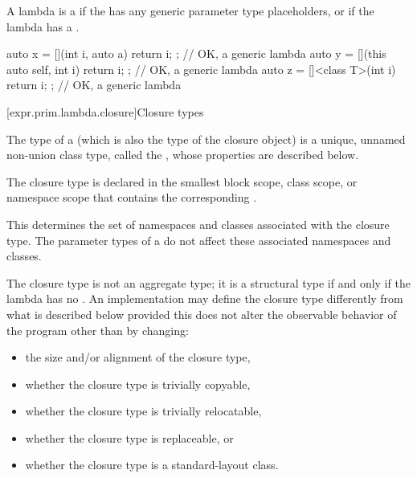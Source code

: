 \pnum
A lambda is a 
if the 
has any generic parameter type placeholders, or
if the lambda has a .
\begin{example}
\begin{codeblock}
auto x = [](int i, auto a) { return i; };               // OK, a generic lambda
auto y = [](this auto self, int i) { return i; };       // OK, a generic lambda
auto z = []<class T>(int i) { return i; };              // OK, a generic lambda
\end{codeblock}
\end{example}

[expr.prim.lambda.closure]{Closure types}%

\pnum
The type of a  (which is also the type of the
closure object) is a unique, unnamed non-union class type,
called the ,
whose properties are described below.

\pnum
The closure type is declared in the smallest block
scope, class scope, or namespace scope that contains the corresponding
.
\begin{note}
This determines the set of namespaces and
classes associated with the closure type. The parameter
types of a  do not affect these associated namespaces and
classes.
\end{note}

\pnum
The closure type is not an aggregate type;
it is a structural type if and only if
the lambda has no .
An implementation may define the closure type differently from what
is described below provided this does not alter the observable behavior of the program
other than by changing:
\begin{itemize}
\item the size and/or alignment of the closure type,
\item whether the closure type is trivially copyable,
\item whether the closure type is trivially relocatable,
\item whether the closure type is replaceable, or
\item whether the closure type is a standard-layout class.
\end{itemize}

